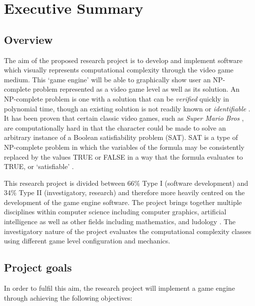 \documentclass[a4paper]{article}
\begin{document}
\section{Executive Summary}

\subsection{Overview}

The aim of the proposed research project is to develop and implement software which visually
represents computational complexity through the video game medium. This `game engine' will be able
to graphically show user an NP-complete problem represented as a video game level as well as its
solution. An NP-complete problem is one with a solution that can be \textit{verified} quickly in
polynomial time, though an existing solution is not readily known or \textit{identifiable}
\cite{cook1984can}. It has been proven that certain classic video games, such as \textit{Super Mario
Bros} \cite{Aloupis2012}, are computationally hard in that the character could be made to solve an
arbitrary instance of a Boolean satisfiability problem (SAT). SAT is a type of NP-complete problem
in which the variables of the formula may be consistently replaced by the values TRUE or FALSE in a
way that the formula evaluates to TRUE, or `satisfiable' \cite{cook1971complexity}.

This research project is divided between 66\% Type I (software development) and 34\% Type II
(investigatory, research) and therefore more heavily centred on the development of the game engine
software. The project brings together multiple disciplines within computer science including
computer graphics, artificial intelligence as well as other fields including mathematics, and
ludology \cite{Hendrikx:2013:PCG:2422956.2422957}. The investigatory nature of the project evaluates
the computational complexity classes using different game level configuration and mechanics.

\subsection{Project goals}

In order to fulfil this aim, the research project will implement a game engine through achieving the
following objectives:
\end{document}
